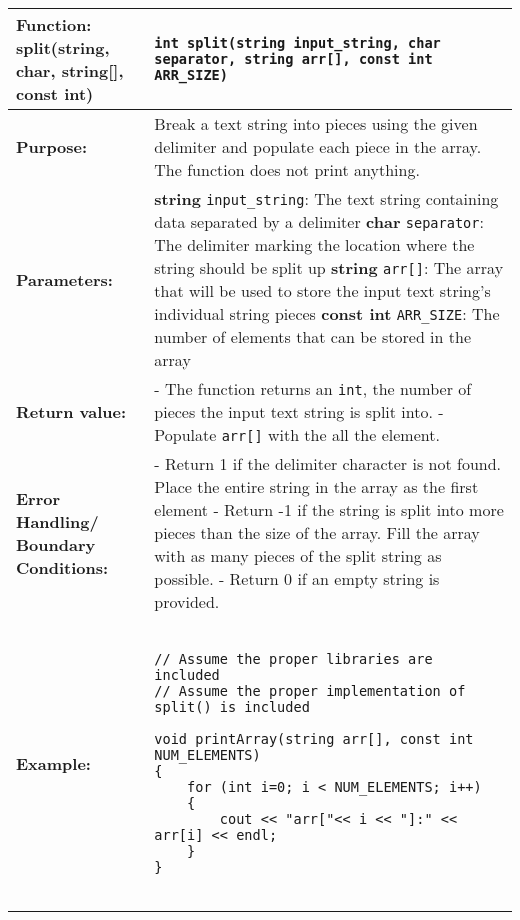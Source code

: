 \newpage
\begin{longtable}[H]{|p{1.7in}|p{4.0in}|} \hline
        \textbf{Function:} \newline 
        split(string, char, string[], const int) & \texttt{int split(string input_string, char separator, string arr[], const int ARR_SIZE)}
        \\ \hline
        \textbf{Purpose:}  & Break a text string into pieces using the given delimiter and populate each piece in the array. The function does not print anything.\\ \hline
        \textbf{Parameters:} &  
        \textbf{string} \texttt{input\_string}: The text string containing data separated by a delimiter \newline
        \textbf{char} \texttt{separator}: The delimiter marking the location where the string should be split up\newline
        \textbf{string} \texttt{arr[]}: The array that will be used to store the input text string's individual string pieces\newline
        \textbf{const int} \texttt{ARR\_SIZE}: The number of elements that can be stored in the array
\\ \hline
        \textbf{Return value:} &  
        - The function returns an \texttt{int}, the number of pieces the input text string is split into. 
        \newline
        - Populate \texttt{arr[]} with the all the element.
\\ \hline
        \textbf{Error Handling/ Boundary Conditions:} & - Return 1 if the delimiter character is not found. Place the entire string in the array as the first element
        \newline
        - Return -1 if the string is split into more pieces than the size of the array. Fill the array with as many pieces of the split string as possible. \newline
        - Return 0 if an empty string is provided.
        \\ \hline
        \textbf{Example:} & 
               
        \begin{example} 
        \begin{verbatim}

// Assume the proper libraries are included
// Assume the proper implementation of split() is included

void printArray(string arr[], const int NUM_ELEMENTS)
{
    for (int i=0; i < NUM_ELEMENTS; i++)
    {
        cout << "arr["<< i << "]:" << arr[i] << endl;
    }   
}


\end{verbatim}
\end{example}
\end{longtable}
